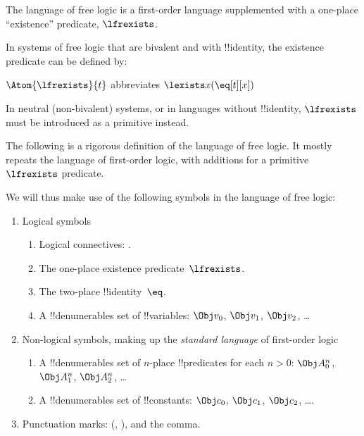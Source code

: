 \documentclass[../../../include/open-logic-section]{subfiles}
\begin{document}


The language of free logic is a first-order language supplemented with a 
one-place ``existence'' predicate, $\lfrexists$.

In systems of free logic that are bivalent and with !!{identity}, the 
existence predicate can be defined by:

\begin{defn}
$\Atom{\lfrexists}{t}$ abbreviates $\lexists x (\eq[t][x])$
\end{defn}

In neutral (non-bivalent) systems, or in languages without !!{identity}, 
$\lfrexists$ must be introduced as a primitive instead.

The following is a rigorous definition of the language of free logic. It mostly
repeats the language of first-order logic, with additions for a 
primitive $\lfrexists$ predicate.

We will thus make use of the following symbols in the language of 
free logic: 

\begin{enumerate}
\item Logical symbols
\begin{enumerate}
\item Logical connectives:
  \startycommalist
  .
\item The one-place existence predicate~$\lfrexists$.
\item The two-place !!{identity}~$\eq$.
\item A !!{denumerable}s set of !!{variable}s: $\Obj v_0$, $\Obj v_1$, $\Obj
  v_2$, \dots
\end{enumerate}
\item Non-logical symbols, making up the \emph{standard
  language} of first-order logic
\begin{enumerate}
\item A !!{denumerable}s set of $n$-place !!{predicate}s for each $n>0$: $\Obj
  A^n_0$, $\Obj A^n_1$, $\Obj A^n_2$, \dots
\item A !!{denumerable}s set of !!{constant}s: $\Obj c_0$, $\Obj c_1$, $\Obj
  c_2$, \dots.
\end{enumerate}
\item Punctuation marks: (, ), and the comma.
\end{enumerate}
\end{document}
